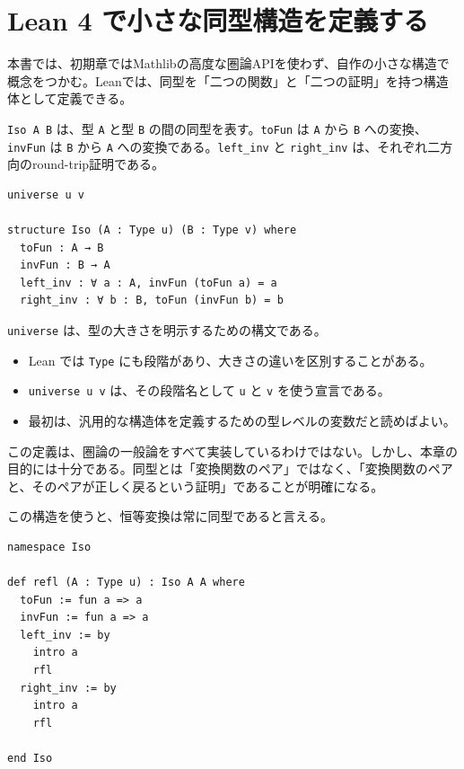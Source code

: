 \section{Lean 4 で小さな同型構造を定義する}
\label{sec:ch06-lean-iso}

本書では、初期章ではMathlibの高度な圏論APIを使わず、自作の小さな構造で概念をつかむ。Leanでは、同型を「二つの関数」と「二つの証明」を持つ構造体として定義できる。

\begin{leanbox}
\texttt{Iso A B} は、型 \texttt{A} と型 \texttt{B} の間の同型を表す。\texttt{toFun} は \texttt{A} から \texttt{B} への変換、\texttt{invFun} は \texttt{B} から \texttt{A} への変換である。\texttt{left\_inv} と \texttt{right\_inv} は、それぞれ二方向のround-trip証明である。
\end{leanbox}

\begin{listing}[htbp]
\begin{verbatim}
universe u v

structure Iso (A : Type u) (B : Type v) where
  toFun : A → B
  invFun : B → A
  left_inv : ∀ a : A, invFun (toFun a) = a
  right_inv : ∀ b : B, toFun (invFun b) = b
\end{verbatim}
\caption{同型を表す小さな構造}
\label{lst:ch06_iso_structure}
\end{listing}

\begin{syntaxbox}
\texttt{universe} は、型の大きさを明示するための構文である。
\begin{itemize}
\item Lean では \texttt{Type} にも段階があり、大きさの違いを区別することがある。
\item \texttt{universe u v} は、その段階名として \texttt{u} と \texttt{v} を使う宣言である。
\item 最初は、汎用的な構造体を定義するための型レベルの変数だと読めばよい。
\end{itemize}
\end{syntaxbox}


この定義は、圏論の一般論をすべて実装しているわけではない。しかし、本章の目的には十分である。同型とは「変換関数のペア」ではなく、「変換関数のペアと、そのペアが正しく戻るという証明」であることが明確になる。

この構造を使うと、恒等変換は常に同型であると言える。

\begin{listing}[htbp]
\begin{verbatim}
namespace Iso

def refl (A : Type u) : Iso A A where
  toFun := fun a => a
  invFun := fun a => a
  left_inv := by
    intro a
    rfl
  right_inv := by
    intro a
    rfl

end Iso
\end{verbatim}
\caption{同じ型は自明に同型である}
\label{lst:ch06_iso_refl}
\end{listing}

